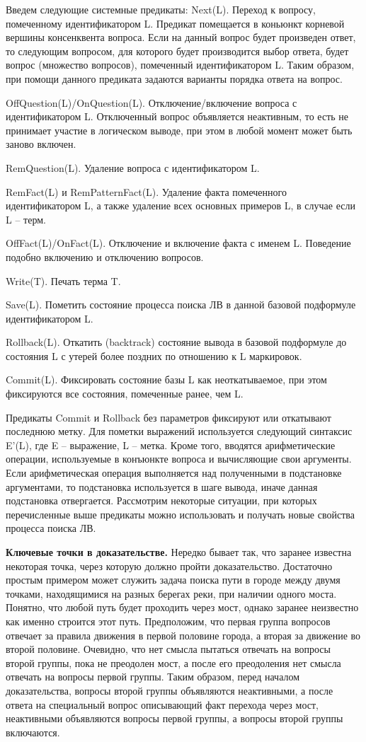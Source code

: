 Введем следующие системные предикаты:
Next(L). Переход к вопросу, помеченному идентификатором L. Предикат помещается в коньюнкт корневой вершины консенквента вопроса.  Если на данный вопрос будет произведен ответ, то следующим вопросом, для которого будет производится выбор ответа, будет вопрос (множество вопросов), помеченный идентификатором L. Таким образом, при помощи данного предиката задаются варианты порядка ответа на вопрос.

OffQuestion(L)/OnQuestion(L). Отключение/включение вопроса с идентификатором L. Отключенный вопрос объявляется неактивным, то есть не принимает участие в логическом выводе, при этом в любой момент может быть заново включен.

RemQuestion(L). Удаление вопроса с идентификатором L.

RemFact(L) и RemPatternFact(L). Удаление факта помеченного идентификатором L, а также удаление всех основных примеров L, в случае если L – терм.

OffFact(L)/OnFact(L). Отключение и включение факта с именем L. Поведение подобно включению и отключению вопросов.

Write(T). Печать терма T.

Save(L). Пометить состояние процесса поиска ЛВ в данной базовой подформуле идентификатором L.

Rollback(L). Откатить (backtrack) состояние вывода в базовой подформуле до состояния L с утерей более поздних по отношению к L маркировок.

Commit(L). Фиксировать состояние базы L как неоткатываемое, при этом фиксируются все состояния, помеченные ранее, чем L.

Предикаты Commit и Rollback без параметров фиксируют или откатывают последнюю метку.
Для пометки выражений используется следующий синтаксис E’(L), где E – выражение, L – метка.
Кроме того, вводятся арифметические операции, используемые в конъюнкте вопроса и вычисляющие свои аргументы. Если арифметическая операция выполняется над полученными в подстановке аргументами, то подстановка используется в шаге вывода, иначе данная подстановка отвергается.
Рассмотрим некоторые ситуации, при которых перечисленные выше предикаты можно использовать и получать новые свойства процесса поиска ЛВ.

\textbf{Ключевые точки в доказательстве.} Нередко бывает так, что заранее известна некоторая точка, через которую должно пройти доказательство. Достаточно простым примером может служить задача поиска пути в городе между двумя точками, находящимися на разных берегах реки, при наличии одного моста. Понятно, что любой путь будет проходить через мост, однако заранее неизвестно как именно строится этот путь. Предположим, что первая группа вопросов отвечает за правила движения в первой половине города, а вторая за движение во второй половине. Очевидно, что нет смысла пытаться отвечать на вопросы второй группы, пока не преодолен мост, а после его преодоления нет смысла отвечать на вопросы первой группы. Таким образом, перед началом доказательства, вопросы второй группы объявляются неактивными, а после ответа на специальный вопрос описывающий факт перехода через мост, неактивными объявляются вопросы первой группы, а вопросы второй группы включаются.

